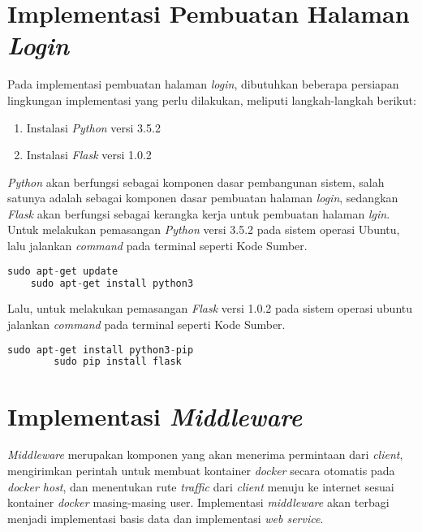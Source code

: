   \section{Implementasi Pembuatan Halaman \textit{Login}}
  Pada implementasi pembuatan halaman \textit{login}, dibutuhkan beberapa persiapan lingkungan implementasi yang perlu dilakukan, meliputi langkah-langkah berikut:
  \begin{enumerate}
  	\item Instalasi \textit{Python} versi 3.5.2
  	\item Instalasi \textit{Flask} versi 1.0.2
  \end{enumerate}
  \textit{Python} akan berfungsi sebagai komponen dasar pembangunan sistem, salah satunya adalah sebagai komponen dasar pembuatan halaman \textit{login}, sedangkan \textit{Flask} akan berfungsi sebagai kerangka kerja untuk pembuatan halaman \textit{lgin}. Untuk melakukan pemasangan \textit{Python} versi 3.5.2 pada sistem operasi Ubuntu, lalu jalankan \textit{command} pada terminal seperti Kode Sumber.\\
  \begin{minipage}{\linewidth}
  	\begin{lstlisting}[caption=Command untuk installasi Python,language=Python,label=installcollectd]
  	sudo apt-get update
  	sudo apt-get install python3
  	\end{lstlisting}
  \end{minipage}
  Lalu, untuk melakukan pemasangan \textit{Flask} versi 1.0.2 pada sistem operasi ubuntu jalankan \textit{command} pada terminal seperti Kode Sumber.\\
	\begin{minipage}{\linewidth}
	   	\begin{lstlisting}[caption=Command untuk installasi Flask,language=Python,label=installcollectd]
	   	sudo apt-get install python3-pip
	   	sudo pip install flask
	   	\end{lstlisting}
	\end{minipage}
	
  \section{Implementasi \textit{Middleware}}
  \textit{Middleware} merupakan komponen yang akan menerima permintaan dari \textit{client}, mengirimkan perintah untuk membuat kontainer \textit{docker} secara otomatis pada \textit{docker host}, dan menentukan rute \textit{traffic} dari \textit{client} menuju ke internet sesuai kontainer \textit{docker} masing-masing user. Implementasi \textit{middleware} akan terbagi menjadi implementasi basis data dan implementasi \textit{web service}.
